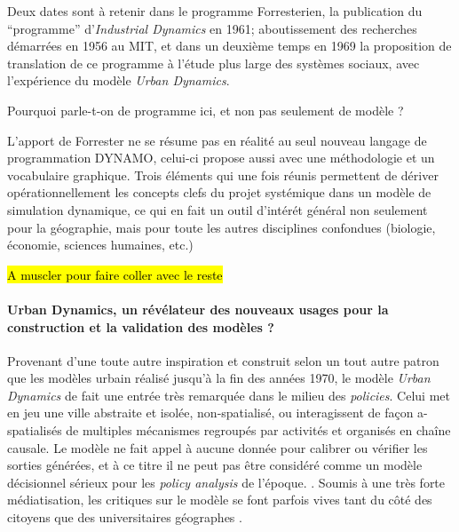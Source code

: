 Deux dates sont à retenir dans le programme Forresterien, la publication du \enquote{programme} d'\textit{Industrial Dynamics} en 1961; aboutissement des recherches démarrées en 1956 au MIT, et dans un deuxième temps en 1969 la proposition de translation de ce programme à l'étude plus large des systèmes sociaux, avec l'expérience du modèle \textit{Urban Dynamics}.

Pourquoi parle-t-on de programme ici, et non pas seulement de modèle ?

L'apport de Forrester ne se résume pas en réalité au seul nouveau langage de programmation DYNAMO, celui-ci propose aussi avec une méthodologie et un vocabulaire graphique. Trois éléments qui une fois réunis permettent de dériver opérationnellement les concepts clefs du projet systémique dans un modèle de simulation dynamique, ce qui en fait un outil d'intérét général non seulement pour la géographie, mais pour toute les autres disciplines confondues (biologie, économie, sciences humaines, etc.) \autocite{Rosnay1975}

\hl{A muscler pour faire coller avec le reste}

\paragraph{Urban Dynamics, un révélateur des nouveaux usages pour la construction et la validation des modèles ?}
\label{p:urbanDyn_revelateur}

Provenant d'une toute autre inspiration et construit selon un tout autre patron que les modèles urbain réalisé jusqu'à la fin des années 1970, le modèle \textit{Urban Dynamics} de \textcite{Forrester1969} fait une entrée très remarquée dans le milieu des \textit{policies}. Celui met en jeu une ville abstraite et isolée, non-spatialisé, ou interagissent de façon a-spatialisés de multiples mécanismes regroupés par activités et organisés en chaîne causale. Le modèle ne fait appel à aucune donnée pour calibrer ou vérifier les sorties générées, et à ce titre il ne peut pas être considéré comme un modèle décisionnel sérieux pour les \textit{policy analysis} de l'époque. \autocite{Lee1973}. Soumis à une très forte médiatisation, les critiques sur le modèle se font parfois vives tant du côté des citoyens \autocites{Forrester1989, Forrester2007} que des universitaires géographes \autocites{Tobler1970a, Berry1970b, Batty1971, Batty1976} .

